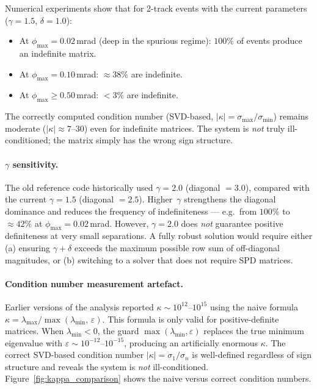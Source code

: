 \documentclass[12pt,a4paper]{article}
\begin{document}
Numerical experiments show that for 2-track events with the
current parameters ($\gamma = 1.5$, $\delta = 1.0$):
\begin{itemize}
  \item At $\phi_\text{max} = 0.02$\,mrad (deep in the spurious regime):
    $100\%$ of events produce an indefinite matrix.
  \item At $\phi_\text{max} = 0.10$\,mrad: $\approx38\%$ are indefinite.
  \item At $\phi_\text{max} \geq 0.50$\,mrad: $<3\%$ are indefinite.
\end{itemize}
The correctly computed condition number (SVD-based, $|\kappa| = \sigma_\text{max}/\sigma_\text{min}$)
remains moderate ($|\kappa| \approx 7\text{--}30$) even for indefinite matrices.
The system is \emph{not} truly ill-conditioned; the matrix simply has the
wrong sign structure.

\paragraph{$\gamma$ sensitivity.}
The old reference code historically used $\gamma = 2.0$ (diagonal $= 3.0$),
compared with the current $\gamma = 1.5$ (diagonal $= 2.5$).
Higher~$\gamma$ strengthens the diagonal dominance and reduces the
frequency of indefiniteness — e.g.\ from $100\%$ to $\approx42\%$ at
$\phi_\text{max} = 0.02$\,mrad.
However, $\gamma = 2.0$ does \emph{not} guarantee positive definiteness at
very small separations.
A fully robust solution would require either (a) ensuring
$\gamma + \delta$ exceeds the maximum possible row sum of off-diagonal
magnitudes, or (b) switching to a solver that does not require SPD matrices.

\paragraph{Condition number measurement artefact.}
Earlier versions of the analysis reported $\kappa \sim 10^{12}\text{--}10^{15}$
using the naive formula $\kappa = \lambda_\text{max}/\max(\lambda_\text{min},\,\varepsilon)$.
This formula is only valid for positive-definite matrices.
When $\lambda_\text{min} < 0$, the guard $\max(\lambda_\text{min},\varepsilon)$
replaces the true minimum eigenvalue with $\varepsilon \sim 10^{-12}\text{--}10^{-15}$,
producing an artificially enormous $\kappa$.
The correct SVD-based condition number $|\kappa| = \sigma_1 / \sigma_n$ is well-defined
regardless of sign structure and reveals the system is \emph{not} ill-conditioned.
Figure~\ref{fig:kappa_comparison} shows the naive versus correct condition numbers.
\end{document}

